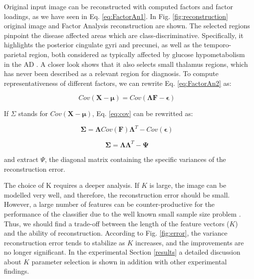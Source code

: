 Original input image can be reconstructed with computed factors and factor loadings, as we have seen in Eq. \ref{eq:FactorAn1}. In Fig. \ref{fig:reconstruction} original image and Factor Analysis reconstruction are shown. The selected regions pinpoint the disease affected areas which are class-discriminative. Specifically, it highlights the posterior cingulate gyri and precunei, as well as the temporo-parietal region, both considered as typically affected by glucose hypometabolism in the AD \cite{Claus1994}. A closer look shows that it also selects small thalamus regions, which has never been described as a relevant region for diagnosis. To compute representativeness of different factors, we can rewrite Eq. \ref{eq:FactorAn2} as:

\begin{equation}\label{eq:cov}
Cov (\textbf{X} - \boldsymbol\mu) = Cov(\boldsymbol\Lambda \textbf{F} - \boldsymbol\epsilon)
\end{equation}

If $\Sigma$ stands for $Cov (\textbf{X} - \boldsymbol\mu)$, Eq. \ref{eq:cov} can be rewritted as:

\begin{equation}
\boldsymbol\Sigma = \boldsymbol\Lambda Cov(\textbf{F}) \boldsymbol\Lambda^T - Cov(\boldsymbol\epsilon)
\end{equation}

\begin{equation}
\boldsymbol\Sigma = \boldsymbol\Lambda \boldsymbol\Lambda^T - \boldsymbol\Psi
\end{equation}

\noindent and extract $\Psi$, the diagonal matrix containing the specific variances of the reconstruction error.

The choice of K requires a deeper analysis. If $K$ is large, the image can be modelled very well, and therefore, the reconstruction error should be small. However, a large number of features can be counter-productive for the performance of the classifier due to the well known small sample size problem \cite{Duin00}. Thus, we should find a trade-off between the length of the feature vectors ($K$) and the ability of reconstruction. According to Fig. \ref{fig:error}, the variance reconstruction error tends to stabilize as $K$ increases, and the improvements are no longer significant. In the experimental Section \ref{results} a detailed discussion about $K$ parameter selection is shown in addition with other experimental findings.


